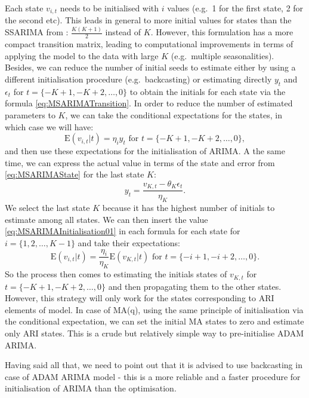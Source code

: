 \documentclass[
]{book}
\theoremstyle{definition}
\theoremstyle{definition}
\theoremstyle{definition}
\theoremstyle{definition}
\theoremstyle{remark}
\begin{document}
Each state \(v_{i,t}\) needs to be initialised with \(i\) values (e.g.~1 for the first state, 2 for the second etc). This leads in general to more initial values for states than the SSARIMA from \citet{Svetunkov2019}: \(\frac{K(K+1)}{2}\) instead of \(K\). However, this formulation has a more compact transition matrix, leading to computational improvements in terms of applying the model to the data with large \(K\) (e.g.~multiple seasonalities). Besides, we can reduce the number of initial seeds to estimate either by using a different initialisation procedure (e.g.~backcasting) or estimating directly \(y_t\) and \(\epsilon_t\) for \(t=\{-K+1, -K+2, \dots, 0\}\) to obtain the initials for each state via the formula \eqref{eq:MSARIMATransition}. In order to reduce the number of estimated parameters to \(K\), we can take the conditional expectations for the states, in which case we will have:
\begin{equation*}
  \mathrm{E}(v_{i,t} | t) = \eta_i y_{t} \text{ for } t=\{-K+1, -K+2, \dots, 0\},
\end{equation*}
and then use these expectations for the initialisation of ARIMA. A the same time, we can express the actual value in terms of the state and error from \eqref{eq:MSARIMAState} for the last state \(K\):
\begin{equation}
  y_{t} = \frac{v_{K,t} - \theta_K \epsilon_{t}}{\eta_K}.
  \label{eq:MSARIMAInitialisation01}
\end{equation}
We select the last state \(K\) because it has the highest number of initials to estimate among all states. We can then insert the value \eqref{eq:MSARIMAInitialisation01} in each formula for each state for \(i=\{1, 2, \dots, K-1\}\) and take their expectations:
\begin{equation}
  \mathrm{E}(v_{i,t}|t) = \frac{\eta_i}{\eta_K} \mathrm{E}(v_{K,t}|t)  \text{ for } t=\{-i+1, -i+2, \dots, 0\}.
  \label{eq:MSARIMAInitialisation02}
\end{equation}
So the process then comes to estimating the initials states of \(v_{K,t}\) for \(t=\{-K+1, -K+2, \dots, 0\}\) and then propagating them to the other states. However, this strategy will only work for the states corresponding to ARI elements of model. In case of MA(q), using the same principle of initialisation via the conditional expectation, we can set the initial MA states to zero and estimate only ARI states. This is a crude but relatively simple way to pre-initialise ADAM ARIMA.

Having said all that, we need to point out that it is advised to use backcasting in case of ADAM ARIMA model - this is a more reliable and a faster procedure for initialisation of ARIMA than the optimisation.
\end{document}

